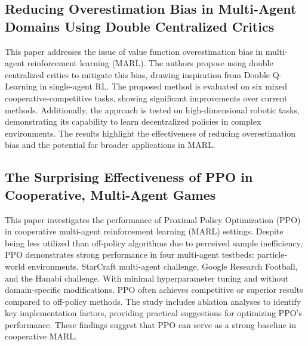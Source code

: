 \documentclass[journal]{IEEEtran}
\begin{document}
\subsection{Reducing Overestimation Bias in Multi-Agent Domains Using Double Centralized Critics}
This paper addresses the issue of value function overestimation bias in multi-agent reinforcement learning (MARL). The authors propose using double centralized critics to mitigate this bias, drawing inspiration from Double Q-Learning in single-agent RL. The proposed method is evaluated on six mixed cooperative-competitive tasks, showing significant improvements over current methods. Additionally, the approach is tested on high-dimensional robotic tasks, demonstrating its capability to learn decentralized policies in complex environments. The results highlight the effectiveness of reducing overestimation bias and the potential for broader applications in MARL.
\cite{ackermann2019}

\subsection{The Surprising Effectiveness of PPO in Cooperative, Multi-Agent Games}
This paper investigates the performance of Proximal Policy Optimization (PPO) in cooperative multi-agent reinforcement learning (MARL) settings. Despite being less utilized than off-policy algorithms due to perceived sample inefficiency, PPO demonstrates strong performance in four multi-agent testbeds: particle-world environments, StarCraft multi-agent challenge, Google Research Football, and the Hanabi challenge. With minimal hyperparameter tuning and without domain-specific modifications, PPO often achieves competitive or superior results compared to off-policy methods. The study includes ablation analyses to identify key implementation factors, providing practical suggestions for optimizing PPO's performance. These findings suggest that PPO can serve as a strong baseline in cooperative MARL.
\cite{yu2022}
\end{document}
